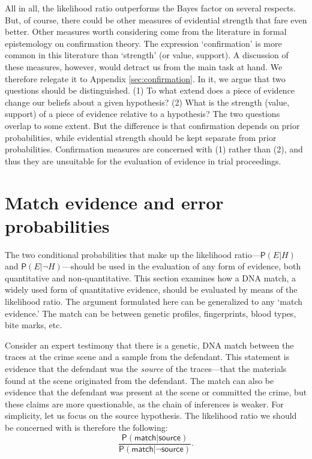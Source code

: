 \documentclass[
  10pt,
  dvipsnames,enabledeprecatedfontcommands]{scrartcl}
\newcommand{\pr}[1]{\mathsf{P}(#1)}
\begin{document}
\normalsize

All in all, the likelihood ratio outperforms the Bayes factor on several
respects. But, of course, there could be other measures of evidential
strength that fare even better. Other measures worth considering come
from the literature in formal epistemology on confirmation theory. The
expression `confirmation' is more common in this literature than
`strength' (or value, support). A discussion of these measures, however,
would detract us from the main task at hand. We therefore relegate it to
Appendix \ref{sec:confirmation}. In it, we argue that two questions
should be distinguished. (1) To what extend does a piece of evidence
change our beliefs about a given hypothesis? (2) What is the strength
(value, support) of a piece of evidence relative to a hypothesis? The
two questions overlap to some extent. But the difference is that
confirmation depends on prior probabilities, while evidential strength
should be kept separate from prior probabilities. Confirmation measures
are concerned with (1) rather than (2), and thus they are unsuitable for
the evaluation of evidence in trial proceedings.

\hypertarget{match-evidence-and-error-probabilities}{%
\section{\texorpdfstring{Match evidence and error probabilities
\label{sec:fp}}{Match evidence and error probabilities }}\label{match-evidence-and-error-probabilities}}

The two conditional probabilities that make up the likelihood
ratio---\(\pr{E \vert H}\) and \(\pr{E \vert \neg H}\)---should be used
in the evaluation of any form of evidence, both quantitative and
non-quantitative. This section examines how a DNA match, a widely used
form of quantitative evidence, should be evaluated by means of the
likelihood ratio. The argument formulated here can be generalized to any
`match evidence.' The match can be between genetic profiles,
fingerprints, blood types, bite marks, etc.

Consider an expert testimony that there is a genetic, DNA match between
the traces at the crime scene and a sample from the defendant. This
statement is evidence that the defendant was the \textit{source} of the
traces---that the materials found at the scene originated from the
defendant. The match can also be evidence that the defendant was present
at the scene or committed the crime, but these claims are more
questionable, as the chain of inferences is weaker. For simplicity, let
us focus on the source hypothesis. The likelihood ratio we should be
concerned with is therefore the following:
\[\frac{\pr{\textsf{match} \vert \textsf{source}}}{\pr{\textsf{match} \vert \neg \textsf{source}}}.\]
\end{document}
